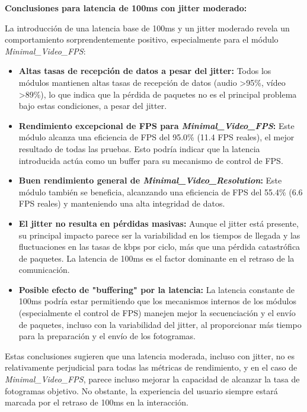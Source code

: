 \vspace{\baselineskip}

\textbf{Conclusiones para latencia de 100ms con jitter moderado:}

La introducción de una latencia base de 100ms y un jitter moderado revela un comportamiento sorprendentemente positivo, especialmente para el módulo \textit{Minimal\_Video\_FPS}:

\begin{itemize}
\item \textbf{Altas tasas de recepción de datos a pesar del jitter:} Todos los módulos mantienen altas tasas de recepción de datos (audio >95\%, vídeo >89\%), lo que indica que la pérdida de paquetes no es el principal problema bajo estas condiciones, a pesar del jitter.
\item \textbf{Rendimiento excepcional de FPS para \textit{Minimal\_Video\_FPS}:} Este módulo alcanza una eficiencia de FPS del 95.0\% (11.4 FPS reales), el mejor resultado de todas las pruebas. Esto podría indicar que la latencia introducida actúa como un buffer para su mecanismo de control de FPS.
\item \textbf{Buen rendimiento general de \textit{Minimal\_Video\_Resolution}:} Este módulo también se beneficia, alcanzando una eficiencia de FPS del 55.4\% (6.6 FPS reales) y manteniendo una alta integridad de datos.
\item \textbf{El jitter no resulta en pérdidas masivas:} Aunque el jitter está presente, su principal impacto parece ser la variabilidad en los tiempos de llegada y las fluctuaciones en las tasas de kbps por ciclo, más que una pérdida catastrófica de paquetes. La latencia de 100ms es el factor dominante en el retraso de la comunicación.
\item \textbf{Posible efecto de "buffering" por la latencia:} La latencia constante de 100ms podría estar permitiendo que los mecanismos internos de los módulos (especialmente el control de FPS) manejen mejor la secuenciación y el envío de paquetes, incluso con la variabilidad del jitter, al proporcionar más tiempo para la preparación y el envío de los fotogramas.
\end{itemize}

Estas conclusiones sugieren que una latencia moderada, incluso con jitter, no es relativamente perjudicial para todas las métricas de rendimiento, y en el caso de \textit{Minimal\_Video\_FPS}, parece incluso mejorar la capacidad de alcanzar la tasa de fotogramas objetivo. No obstante, la experiencia del usuario siempre estará marcada por el retraso de 100ms en la interacción.

